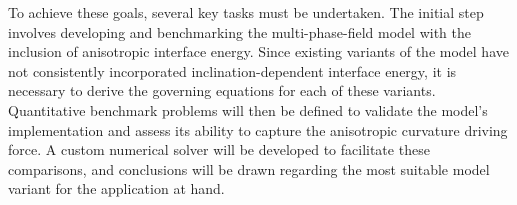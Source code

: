 

To achieve these goals, several key tasks must be undertaken. The initial step involves developing and benchmarking the multi-phase-field model with the inclusion of anisotropic interface energy. Since existing variants of the model have not consistently incorporated inclination-dependent interface energy, it is necessary to derive the governing equations for each of these variants. Quantitative benchmark problems will then be defined to validate the model's implementation and assess its ability to capture the anisotropic curvature driving force. A custom numerical solver will be developed to facilitate these comparisons, and conclusions will be drawn regarding the most suitable model variant for the application at hand.

